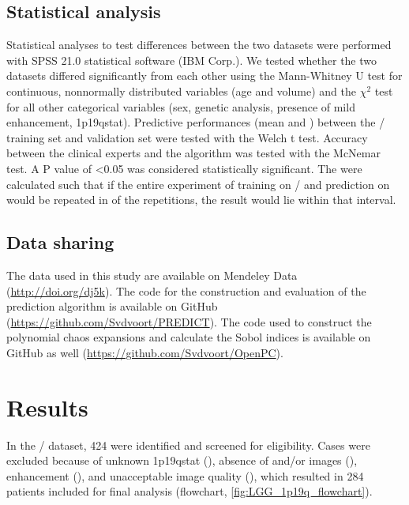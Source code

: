 \subsection{Statistical analysis}

Statistical analyses to test differences between the two datasets were performed with SPSS \num{21.0} statistical software (IBM Corp.).
We tested whether the two datasets differed significantly from each other using the Mann-Whitney U test for continuous, nonnormally distributed variables (age and volume) and the $\chi^2$ test for all other categorical variables (sex, genetic analysis, presence of mild enhancement, \acl{1p19qstat}).
Predictive performances (mean and  ) between the / training set and  validation set were tested with the Welch t test.
Accuracy between the clinical experts and the algorithm was tested with the McNemar test.
A P value of \num{<0.05} was considered statistically significant.
The   were calculated such that if the entire experiment of training on / and prediction on  would be repeated in  of the repetitions, the result would lie within that interval.

\subsection{Data sharing}

The data used in this study are available on Mendeley Data (\url{http://doi.org/dj5k}).
The code for the construction and evaluation of the prediction algorithm is available on GitHub (\url{https://github.com/Svdvoort/PREDICT}).
The code used to construct the polynomial chaos expansions and calculate the Sobol indices is available on GitHub as well \hfill \break (\url{https://github.com/Svdvoort/OpenPC}).


\section{Results}

In the / dataset, 424  were identified and screened for eligibility.
Cases were excluded because of unknown \acl{1p19qstat} (), absence of  and/or   images (), enhancement (), and unacceptable image quality (), which resulted in 284 patients included for final analysis (flowchart, \cref{fig:LGG_1p19q_flowchart}).

